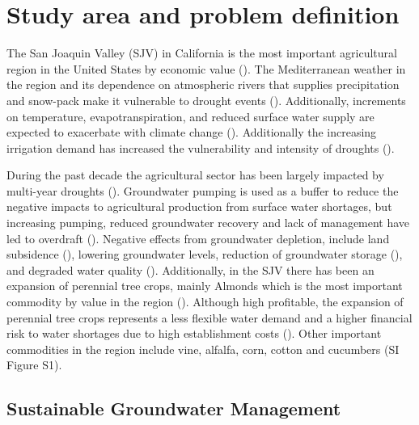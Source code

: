 \documentclass[11pt,a4paper]{article}
\begin{document}
\section{Study area and problem definition}

The San Joaquin Valley (SJV) in California is the most important agricultural region in the United States by economic value (\cite{usda_national_2020}). The Mediterranean weather in the region and its dependence on atmospheric rivers that supplies precipitation and snow-pack make it vulnerable to drought events (\cite{espinoza_global_2018}). Additionally, increments on temperature, evapotranspiration, and reduced surface water supply are expected to exacerbate with climate change (\cite{fernandez-bou_regional_2021}). Additionally the increasing irrigation demand has increased the vulnerability and intensity of droughts (\cite{he_intensification_2017}). 

During the past decade the agricultural sector has been largely impacted by multi-year droughts (\cite{lund_lessons_2018,medellin-azuara_economic_2022}). Groundwater pumping is used as a buffer to reduce the negative impacts to agricultural production from surface water shortages, but increasing pumping, reduced groundwater recovery and lack of management have led to overdraft  (\cite{liu_groundwater_2022}). Negative effects from groundwater depletion, include land subsidence (\cite{ojha_sustained_2018}), lowering groundwater levels, reduction of groundwater storage (\cite{alam_post-drought_2021}), and degraded water quality (\cite{levy_critical_2021}). Additionally, in the SJV there has been an expansion of perennial tree crops, mainly Almonds which is the most important commodity by value  in the region (\cite{usda_national_2020}). Although high profitable, the expansion of perennial tree crops represents a less flexible water demand and a higher financial risk to water shortages due to high establishment costs (\cite{qin_flexibility_2019,mall_water_2019}). Other important commodities in the region include vine, alfalfa, corn, cotton and cucumbers (SI Figure S1). 

\subsection{Sustainable Groundwater Management}
\end{document}
